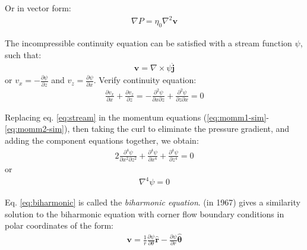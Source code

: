 \documentclass[a4paper,11pt]{article}
\begin{document}
Or in vector form:
\begin{align}
\nabla P = \eta_0\nabla^2\textbf{v} \label{eq:redpressure}
\end{align}

The incompressible continuity equation can be satisfied with a stream function $\psi$, such that:
\begin{align}
\textbf{v} = \nabla\times\psi\hat{\textbf{j}} \label{eq:stream}
\end{align}
or $v_x = -\frac{\partial\psi}{\partial z}$ and $v_z = \frac{\partial\psi}{\partial x}$. Verify continuity equation:
\begin{align}
\frac{\displaystyle \partial v_x}{\displaystyle \partial x}+\frac{\displaystyle \partial v_z}{\displaystyle \partial z} = -\frac{\partial^2\psi}{\partial x\partial z}+\frac{\partial^2\psi}{\partial z\partial x} = 0
\end{align}

Replacing eq. \ref{eq:stream} in the momentum equations (\ref{eq:momm1-sim}-\ref{eq:momm2-sim}), then taking the curl to eliminate the pressure gradient, and adding the component equations together, we obtain:
\begin{align}
2\frac{\partial^4\psi}{\partial x^2\partial z^2}+\frac{\partial^4\psi}{\partial x^4}+\frac{\partial^4\psi}{\partial z^4} = 0
\end{align}
or 
\begin{align}
\nabla^4\psi= 0 \label{eq:biharmonic}
\end{align}

Eq. \ref{eq:biharmonic} is called the \textit{biharmonic equation}. \citet{Batchelor2000} (in 1967) gives a similarity solution to the biharmonic equation with corner flow boundary conditions in polar coordinates of the form:
\begin{align}
\textbf{v} = \frac{1}{r}\frac{\partial\psi}{\partial\theta}\hat{\textbf{r}}-\frac{\partial\psi}{\partial r}\hat{\bm{\theta}} \label{eq:velpolar}
\end{align}
\end{document}

